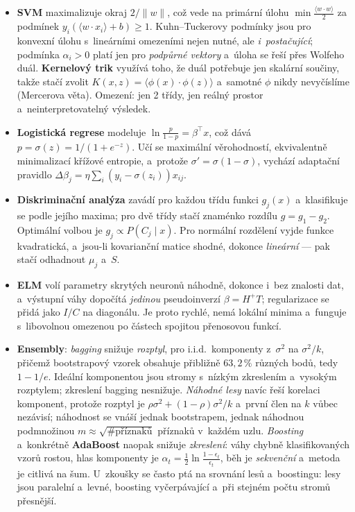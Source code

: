 \documentclass[11pt,a4paper]{article}
\theoremstyle{definition}
\begin{document}
\begin{itemize}
\item \textbf{SVM} maximalizuje okraj $2/\|w\|$, což vede na primární úlohu
      $\min\frac{\langle w\cdot w\rangle}{2}$ za podmínek
      $y_i(\langle w\cdot x_i\rangle+b)\ge 1$. Kuhn--Tuckerovy podmínky jsou pro konvexní
      úlohu s~lineárními omezeními nejen nutné, ale \emph{i~postačující}; podmínka
      $\alpha_i>0$ platí jen pro \emph{podpůrné vektory} a~úloha se řeší přes Wolfeho duál.
      \textbf{Kernelový trik} využívá toho, že duál potřebuje jen skalární součiny, takže
      stačí zvolit $K(x,z)=\langle\phi(x)\cdot\phi(z)\rangle$ a~samotné $\phi$ nikdy
      nevyčíslíme (Mercerova věta). Omezení: jen 2 třídy, jen reálný prostor
      a~neinterpretovatelný výsledek.
\item \textbf{Logistická regrese} modeluje $\ln\frac{p}{1-p}=\beta^{\!\top}x$, což dává
      $p=\sigma(z)=1/(1+e^{-z})$. Učí se maximální věrohodností, ekvivalentně minimalizací
      křížové entropie, a~protože $\sigma'=\sigma(1-\sigma)$, vychází adaptační pravidlo
      $\Delta\beta_j=\eta\sum_i(y_i-\sigma(z_i))x_{ij}$.
\item \textbf{Diskriminační analýza} zavádí pro každou třídu funkci $g_j(x)$ a~klasifikuje se
      podle jejího maxima; pro dvě třídy stačí znaménko rozdílu $g=g_1-g_2$. Optimální volbou
      je $g_j\propto P(C_j\mid x)$. Pro normální rozdělení vyjde funkce kvadratická,
      a~jsou-li kovarianční matice shodné, dokonce \emph{lineární} --- pak stačí odhadnout
      $\mu_j$ a~$S$.
\item \textbf{ELM} volí parametry skrytých neuronů náhodně, dokonce i~bez znalosti dat,
      a~výstupní váhy dopočítá \emph{jedinou} pseudoinverzí $\beta=H^{+}T$; regularizace se
      přidá jako $I/C$ na diagonálu. Je proto rychlé, nemá lokální minima a~funguje
      s~libovolnou omezenou po částech spojitou přenosovou funkcí.
\item \textbf{Ensembly}: \emph{bagging} snižuje \emph{rozptyl}, pro i.i.d.\ komponenty
      z~$\sigma^2$ na $\sigma^2/k$, přičemž bootstrapový vzorek obsahuje přibližně
      $63{,}2\,\%$ různých bodů, tedy $1-1/e$. Ideální komponentou jsou stromy s~nízkým
      zkreslením a~vysokým rozptylem; zkreslení bagging nesnižuje. \emph{Náhodné lesy} navíc
      řeší korelaci komponent, protože rozptyl je $\rho\sigma^2+(1-\rho)\sigma^2/k$ a~první
      člen na $k$ vůbec nezávisí; náhodnost se vnáší jednak bootstrapem, jednak náhodnou
      podmnožinou $m\approx\sqrt{\#\text{příznaků}}$ příznaků v~každém uzlu.
      \emph{Boosting} a~konkrétně \textbf{AdaBoost} naopak snižuje \emph{zkreslení}: váhy
      chybně klasifikovaných vzorů rostou, hlas komponenty je
      $\alpha_t=\frac12\ln\frac{1-\epsilon_t}{\epsilon_t}$, běh je \emph{sekvenční}
      a~metoda je citlivá na šum. U~zkoušky se často ptá na srovnání lesů a~boostingu:
      lesy jsou paralelní a~levné, boosting vyčerpávající a~při stejném počtu stromů
      přesnější.
\end{itemize}
\end{document}
